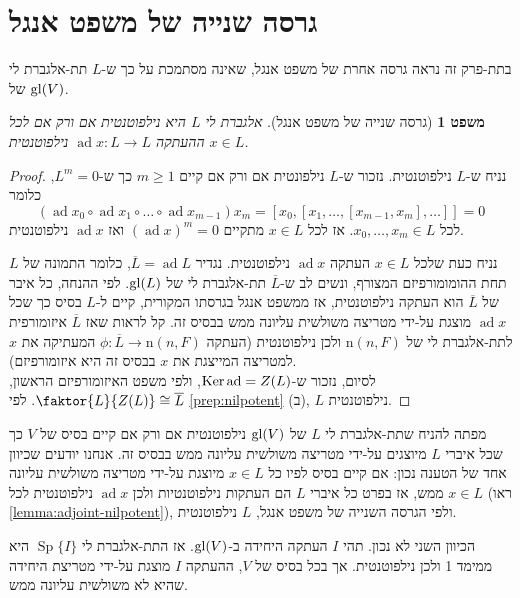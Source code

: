 \documentclass{report}
\theoremstyle{break}
\newtheorem{theorem}{משפט}[chapter]
\theoremstyle{MyNonumberbreak}
\newtheorem{proof}{הוכחה}
\DeclareMathOperator{\Sp}{Sp}
\DeclareMathOperator{\ad}{ad} %
\begin{document}
\section{גרסה שנייה של משפט אנגל}
בתת-פרק זה נראה גרסה אחרת של משפט אנגל, שאינה מסתמכת על כך ש-$L$ תת-אלגברת לי של $\operatorname{gl}(V)$.
\begin{theorem}[גרסה שנייה של משפט אנגל] \label{thm:second-engel}
	אלגברת לי $L$ היא נילפוטנטית אם ורק אם לכל $x \in L$ ההעתקה $\ad x : L \to L$ נילפוטנטית.
\end{theorem}
\begin{proof}
	נניח ש-$L$ נילפוטנטית. נזכור ש-$L$ נילפונטית אם ורק אם קיים $m \ge 1$ כך ש-$L^m = 0$, כלומר
	\[ (\ad x_0 \circ \ad x_1 \circ \ldots \circ \ad x_{m-1})x_m = [x_0, [x_1, \ldots, [x_{m-1}, x_m], \ldots]] = 0 \]
	לכל $x_0, \ldots, x_m \in L$. אז לכל $x \in L$ מתקיים $(\ad x)^m = 0$ ואז $\ad x$ נילפוטנטית.
	
	נניח כעת שלכל $x \in L$ העתקה $\ad x$ נילפוטנטית. נגדיר $\overline{L} = \ad L$, כלומר התמונה של $L$ תחת ההומומורפיזם המצורף, ונשים לב ש-$\overline{L}$ תת-אלגברת לי של $\operatorname{gl}(L)$. לפי ההנחה, כל איבר של $\overline{L}$ הוא העתקה נילפוטנטית, אז ממשפט אנגל בגרסתו המקורית, קיים ל-$L$ בסיס כך שכל $\ad x$ מוצגת על-ידי מטריצה משולשית עליונה ממש בבסיס זה. קל לראות שאז $\overline{L}$ איזומורפית לתת-אלגברת לי של $\mathrm{n}(n, F)$ ולכן נילפוטנטית (העתקה $\phi : \overline{L} \to \mathrm{n}(n, F)$ המעתיקה את $x$ למטריצה המייצגת את $x$ בבסיס זה היא איזומורפיזם). \\
	לסיום, נזכור ש-$\Ker\ad = Z(L)$, ולפי משפט האיזומורפיזם הראשון, $\faktor{L}{Z(L)} \cong \overline{L}$. לפי \autoref*{prep:nilpotent} (ב), $L$ נילפוטנטית.
\end{proof}
מפתה להניח שתת-אלגברת לי $L$ של $\operatorname{gl}(V)$ נילפוטנטית אם ורק אם קיים בסיס של $V$ כך שכל איברי $L$ מיוצגים על-ידי מטריצה משולשית עליונה ממש בבסיס זה. אנחנו יודעים שכיוון אחד של הטענה נכון: אם קיים בסיס לפיו כל $x \in L$ מיוצגת על-ידי מטריצה משולשית עליונה ממש, אז בפרט כל איברי $L$ הם העתקות נילפוטנטיות ולכן $\ad x$ נילפוטנטית לכל $x \in L$ (ראו \autoref*{lemma:adjoint-nilpotent}), ולפי הגרסה השנייה של משפט אנגל, $L$ נילפוטנטית.

הכיוון השני לא נכון. תהי $I$ העתקה היחידה ב-$\operatorname{gl}(V)$. אז התת-אלגברת לי $\Sp\{I\}$ היא ממימד 1 ולכן נילפוטנטית. אך בכל בסיס של $V$, ההעתקה $I$ מוצגת על-ידי מטריצת היחידה שהיא לא משולשית עליונה ממש.
\end{document}
